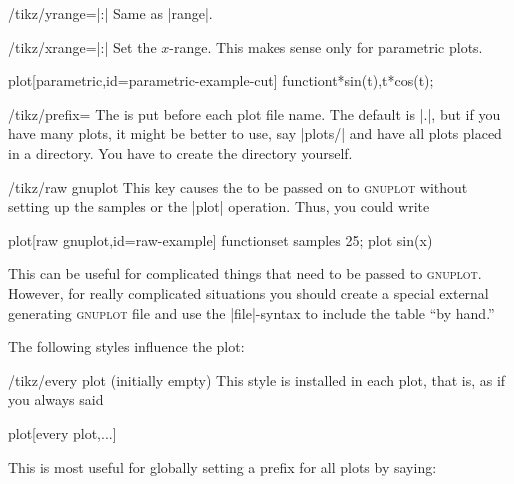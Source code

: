 \begin{key}{/tikz/yrange=|:|}
  Same as |range|.
\end{key}

\begin{key}{/tikz/xrange=|:|}
  Set the $x$-range. This makes sense only for parametric plots.
\begin{codeexample}[]
\tikz \draw[scale=0.5,domain=-3.141:3.141,smooth,xrange=0:1]
  plot[parametric,id=parametric-example-cut] function{t*sin(t),t*cos(t)};
\end{codeexample}
\end{key}


\begin{key}{/tikz/prefix=}
  The  is put before each plot file name. The default is
  |\jobname.|, but
  if you have many plots, it might be better to use, say |plots/| and
  have all plots placed in a directory. You have to create the
  directory yourself.
\end{key}

\begin{key}{/tikz/raw gnuplot}
  This key causes the  to be passed on to
  \textsc{gnuplot} without setting up the samples or the |plot|
  operation. Thus, you could write
\begin{codeexample}
plot[raw gnuplot,id=raw-example] function{set samples 25; plot sin(x)}
\end{codeexample}
  This can be
  useful for complicated things that need to be passed to
  \textsc{gnuplot}. However, for really complicated situations you
  should create a special external generating \textsc{gnuplot} file
  and use the |file|-syntax to include the table ``by hand.''
\end{key}

The following styles influence the plot:
\begin{stylekey}{/tikz/every plot (initially \normalfont empty)}
  This style is installed in each plot, that is, as if you always said
\begin{codeexample}
  plot[every plot,...]
\end{codeexample}
 This is most useful for globally setting a prefix for all plots by saying:
\begin{codeexample}
\end{codeexample}
\end{stylekey}



